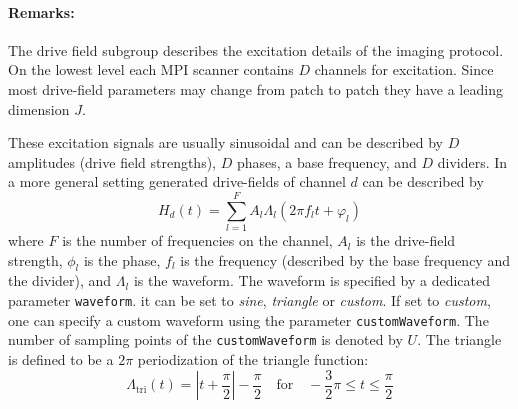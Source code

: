 \documentclass[landscape,a4paper]{article} %
\newcommand{\inl}[1]{\lstinline[columns=fixed]{#1}}
\begin{document}
\begin{multicols}{2}
\paragraph{Remarks:} The drive field subgroup describes the excitation details of the imaging protocol. On the lowest level each MPI scanner contains $D$ channels for excitation. Since most drive-field parameters may change from patch to patch they have a leading dimension $J$.

These excitation signals are usually sinusoidal and can be described by $D$ amplitudes (drive field strengths), $D$ phases, a base frequency, and $D$ dividers. In a more general setting generated drive-fields of channel $d$ can be described by
$$
H_d(t) = \sum_{l=1}^{F} A_l \Lambda_l (2\pi f_l t + \varphi_l)
$$
where $F$ is the number of frequencies on the channel, $A_l$ is the drive-field strength, $\phi_l$ is the phase, $f_l$ is the frequency (described by the base frequency and the divider), and $\Lambda_l$ is the waveform. The waveform is specified by a dedicated parameter \inl{waveform}. it can be set to \textit{sine}, \textit{triangle} or \textit{custom}. If set to \textit{custom}, one can specify a custom waveform using the parameter \inl{customWaveform}. The number of sampling points of the \inl{customWaveform} is denoted by $U$. The triangle is defined to be a $2\pi$ periodization of the
triangle function:
$$
 \Lambda_\text{tri}(t) = \left\vert t+\frac{\pi}{2}\right\vert - \frac{\pi}{2} \quad \text{for} \quad -\frac{3}{2}\pi\leq t \leq \frac{\pi}{2}
$$
\end{multicols}
\end{document}
